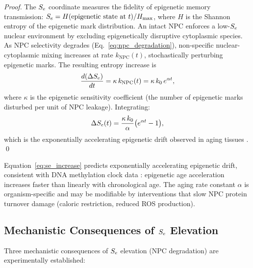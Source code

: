 \begin{proof}
The $S_e$ coordinate measures the fidelity of epigenetic memory transmission:
$S_e = H(\text{epigenetic state at } t) / H_{\max}$, where $H$ is the
Shannon entropy of the epigenetic mark distribution. An intact NPC enforces
a low-$S_e$ nuclear environment by excluding epigenetically disruptive
cytoplasmic species. As NPC selectivity degrades (Eq.~\eqref{eq:npc_degradation}),
non-specific nuclear-cytoplasmic mixing increases at rate $k_{\mathrm{NPC}}(t)$,
stochastically perturbing epigenetic marks. The resulting entropy increase is
\begin{equation}
  \frac{d(\Delta S_e)}{dt} = \kappa\,k_{\mathrm{NPC}}(t)
    = \kappa\,k_0\,e^{\alpha t},
  \label{eq:se_increase_rate}
\end{equation}
where $\kappa$ is the epigenetic sensitivity coefficient (the number of
epigenetic marks disturbed per unit of NPC leakage). Integrating:
\begin{equation}
  \Delta S_e(t) = \frac{\kappa\,k_0}{\alpha}\bigl(e^{\alpha t} - 1\bigr),
  \label{eq:se_increase}
\end{equation}
which is the exponentially accelerating epigenetic drift observed in aging
tissues \citep{Hannum2013,Horvath2013}. \qed
\end{proof}

\begin{remark}
Equation~\eqref{eq:se_increase} predicts exponentially accelerating epigenetic
drift, consistent with DNA methylation clock data \citep{Horvath2013}: epigenetic
age acceleration increases faster than linearly with chronological age.
The aging rate constant $\alpha$ is organism-specific and may be modifiable
by interventions that slow NPC protein turnover damage (caloric restriction,
reduced ROS production).
\end{remark}

\subsection{Mechanistic Consequences of $S_e$ Elevation}
\label{ssec:se_consequences}

Three mechanistic consequences of $S_e$ elevation (NPC degradation) are
experimentally established:

